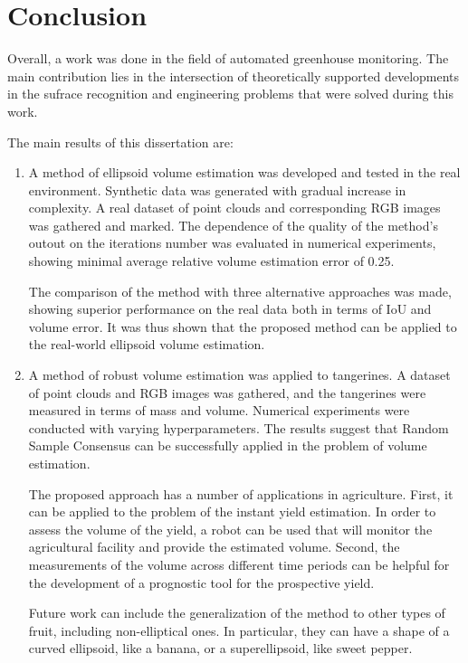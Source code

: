 \chapter*{Conclusion}                       %


%

Overall, a work was done in the field of automated greenhouse monitoring.
The main contribution lies in the intersection of theoretically supported developments in the sufrace recognition and engineering problems that were solved during this work.

The main results of this dissertation are:

\begin{enumerate}
\item A method of ellipsoid volume estimation was developed and tested in the real environment.
Synthetic data was generated with gradual increase in complexity.
A real dataset of point clouds and corresponding RGB images was gathered and marked.
The dependence of the quality of the method's outout on the iterations number was evaluated in numerical experiments, showing minimal average relative volume estimation error of 0.25.

The comparison of the method with three alternative approaches was made, showing superior performance on the real data both in terms of IoU and volume error.
It was thus shown that the proposed method can be applied to the real-world ellipsoid volume estimation.

\item A method of robust volume estimation was applied to tangerines.
A dataset of point clouds and RGB images was gathered, and the tangerines were measured in terms of mass and volume.
Numerical experiments were conducted with varying hyperparameters.
The results suggest that Random Sample Consensus can be successfully applied in the problem of volume estimation.

The proposed approach has a number of applications in agriculture.
First, it can be applied to the problem of the instant yield estimation.
In order to assess the volume of the yield, a robot can be used that will monitor the agricultural facility and provide the estimated volume.
Second, the measurements of the volume across different time periods can be helpful for the development of a prognostic tool for the prospective yield.

Future work can include the generalization of the method to other types of fruit, including non-elliptical ones.
In particular, they can have a shape of a curved ellipsoid, like a banana, or a superellipsoid, like sweet pepper.


\end{enumerate}

